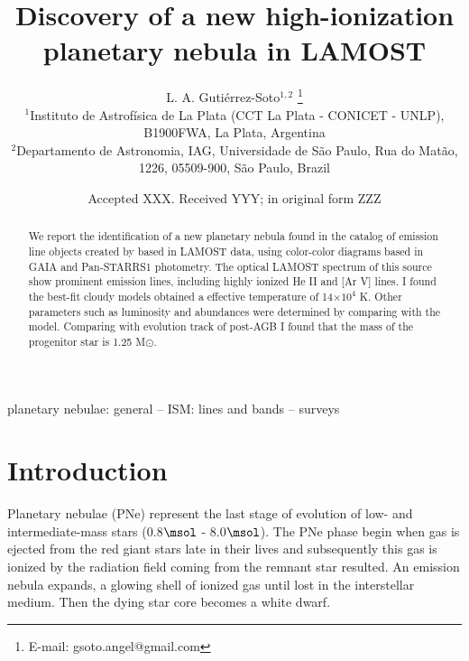\documentclass[fleqn,usenatbib]{mnras}
\title[New high-ionization planetary nebula]{Discovery of a new high-ionization planetary nebula in LAMOST}
\author[Guti\'errez-Soto et al.]{
  L. A. Guti\'errez-Soto$^{1,2}$
  \thanks{E-mail: gsoto.angel@gmail.com}
\\
$^{1}$Instituto de Astrof\'{i}sica de La Plata (CCT La Plata - CONICET - UNLP), B1900FWA, La Plata, Argentina\\
$^{2}$Departamento de Astronomia, IAG, Universidade de S\~{a}o Paulo, Rua do Mat\~{a}o, 1226, 05509-900, S\~{a}o Paulo, Brazil\\
}
\date{Accepted XXX. Received YYY; in original form ZZZ}
\begin{document}
\label{firstpage}
\pagerange{\pageref{firstpage}--\pageref{lastpage}}
\maketitle

\begin{abstract}
  We report the identification of a new planetary nebula found in the catalog of
  emission line objects created by \citet{Skoda:2020} based in LAMOST data, using
  color-color diagrams based in GAIA and Pan-STARRS1 photometry. The optical LAMOST
  spectrum of this source show prominent emission lines, including highly ionized
  He II and [Ar V] lines.
   I found the best-fit {\sc cloudy} models obtained a
  effective temperature of 14$\times10^{4}$ K. Other parameters such as luminosity
  and abundances were determined by comparing with the model.
  Comparing with evolution track of post-AGB I found that the mass
  of the progenitor star is 1.25 M{$\odot$}. 
\end{abstract}

\begin{keywords}
planetary nebulae: general -- ISM: lines and bands -- surveys
\end{keywords}



\section{Introduction}

\label{sec:intro}

Planetary nebulae (PNe) represent the last stage of evolution of low- and intermediate-mass stars
(0.8$\msol$ - 8.0$\msol$). The PNe phase begin when gas is ejected from the red giant stars late
in their lives and subsequently this gas is ionized by the radiation field coming from the remnant
star resulted. An emission nebula expands, a glowing shell of ionized gas until lost in the
interstellar medium. Then the dying star core becomes a white dwarf.
\end{document}
